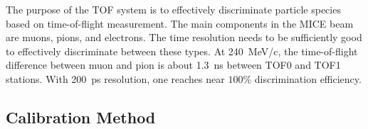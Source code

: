 


The purpose of the TOF system is to effectively discriminate particle species
based on time-of-flight measurement. The main components in the
MICE beam are muons, pions, and electrons. The time resolution needs
to be sufficiently good to effectively discriminate between these
types. At 240~MeV/c, the time-of-flight difference between muon and
pion is about 1.3~ns between TOF0 and TOF1 stations. With 200~ps
resolution, one reaches near $100\%$ discrimination efficiency.



\subsection{Calibration Method}


